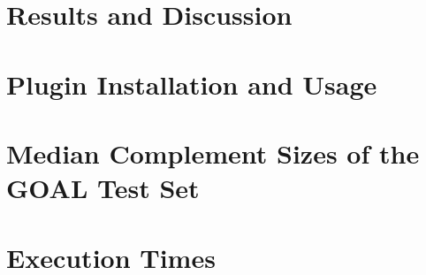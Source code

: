 \documentclass[a4paper]{report}
\newcommand{\goal}{GOAL}
\begin{document}
\chapter{Results and Discussion}
\label{chap_results}
\minitoc
\vspace{1cm}


% 


\appendix
\chapter{Plugin Installation and Usage}
\label{app_plugin}


\chapter{Median Complement Sizes of the \goal{} Test Set}
\label{app_matrices}


\chapter{Execution Times}
\label{app_times}












\end{document}

